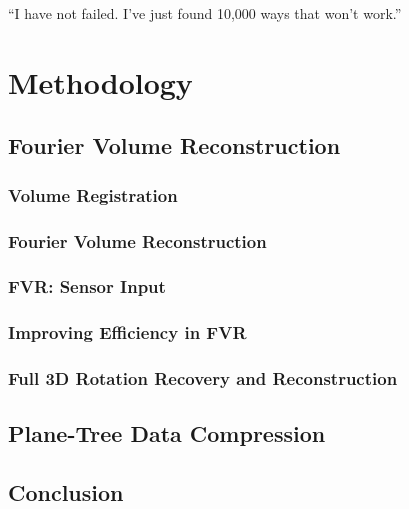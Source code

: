 \begin{savequote}[8cm]
  ``I have not failed. I've just found 10,000 ways that won't work.''
\end{savequote}
\makeatletter
\chapter{Methodology}


\section{Fourier Volume Reconstruction}
\label{FVRSectionA}


\subsection{Volume Registration} \label{Sec:VolumeRegistrationSection}


\subsection{Fourier Volume Reconstruction} \label{Sec:AFVRApproach}


\subsection{FVR: Sensor Input} 
\label{Sec:AMonoFVRApproach}


\subsection{Improving Efficiency in FVR} \label{Sec:Efficiency}


\subsection{Full 3D Rotation Recovery and Reconstruction}




\section{Plane-Tree Data Compression}



\section{Conclusion}